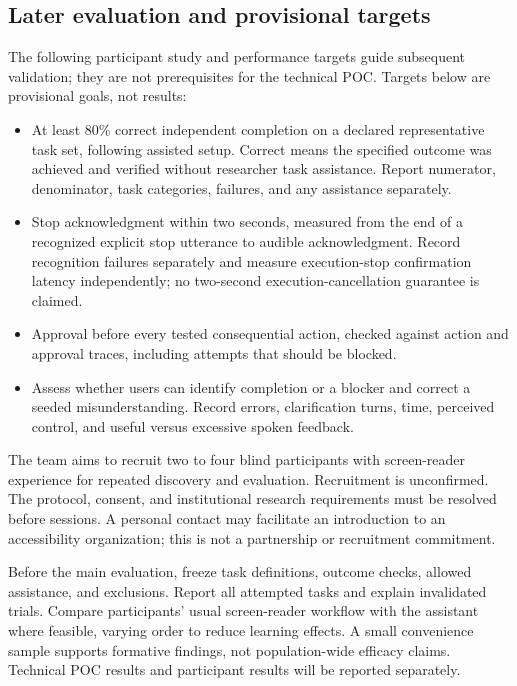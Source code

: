 \documentclass[11pt]{article}
\begin{document}
\subsection{Later evaluation and provisional targets}\label{sec:evaluation}
The following participant study and performance targets guide subsequent
validation; they are not prerequisites for the technical POC.
Targets below are provisional goals, not results:
\begin{itemize}
\item At least 80\% correct independent completion on a declared representative
task set, following assisted setup. Correct means the specified outcome was
achieved and verified without researcher task assistance. Report numerator,
denominator, task categories, failures, and any assistance separately.
\item Stop acknowledgment within two seconds, measured from the end of a
recognized explicit stop utterance to audible acknowledgment. Record recognition
failures separately and measure execution-stop confirmation latency independently;
no two-second execution-cancellation guarantee is claimed.
\item Approval before every tested consequential action, checked against action
and approval traces, including attempts that should be blocked.
\item Assess whether users can identify completion or a blocker and correct a
seeded misunderstanding. Record errors, clarification turns, time, perceived
control, and useful versus excessive spoken feedback.
\end{itemize}
The team aims to recruit two to four blind participants with screen-reader experience for
repeated discovery and evaluation. Recruitment is unconfirmed. The protocol,
consent, and institutional research requirements must be resolved before sessions.
A personal contact may facilitate an introduction to an accessibility organization;
this is not a partnership or recruitment commitment.

Before the main evaluation, freeze task definitions, outcome checks, allowed
assistance, and exclusions. Report all attempted tasks and explain invalidated
trials. Compare participants' usual screen-reader workflow with the assistant
where feasible, varying order to reduce learning effects. A small convenience
sample supports formative findings, not population-wide efficacy claims.
Technical POC results and participant results will be reported separately.
\end{document}
